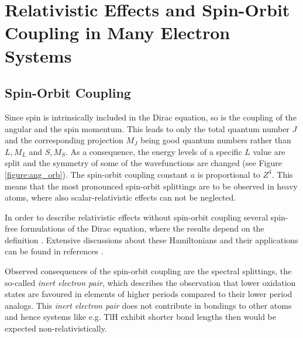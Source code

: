 \section{Relativistic Effects and Spin-Orbit Coupling in Many Electron Systems}
\subsection{Spin-Orbit Coupling}
Since spin is intrinsically included in the Dirac equation, so is the
coupling of the angular and the spin momentum. This leads to
only the total quantum number $J$ and the corresponding projection $M_J$
being good quantum numbers rather than $L, M_L$ and $S, M_S$. As a
consequence, the energy levels of a specific $L$ value are split and the
symmetry of some of the wavefunctions are changed (see Figure
\ref{figure:ang_orb}).
The spin-orbit coupling constant $a$ is proportional to $Z^4$.
This means that the most pronounced spin-orbit splittings are to be observed
in heavy atoms, where also scalar-relativistic effects can not be
neglected.

In order to describe relativistic effects without spin-orbit coupling
several spin-free formulations of the Dirac equation, where the results
depend on the definition \cite{Visscher99}.
Extensive discussions about these Hamiltonians and their applications
can be found in references \cite{ReiherWolf09,Saue11}.

Observed consequences of the spin-orbit coupling are the spectral splittings,
the so-called \emph{inert electron
pair}, which describes the observation that lower oxidation states
are favoured in elements of higher periods compared to their lower period
analogs. This \emph{inert electron pair} does not contribute in bondings
to other atoms and hence systems like e.g. TlH exhibit shorter bond lengths
then would be expected non-relativistically.


